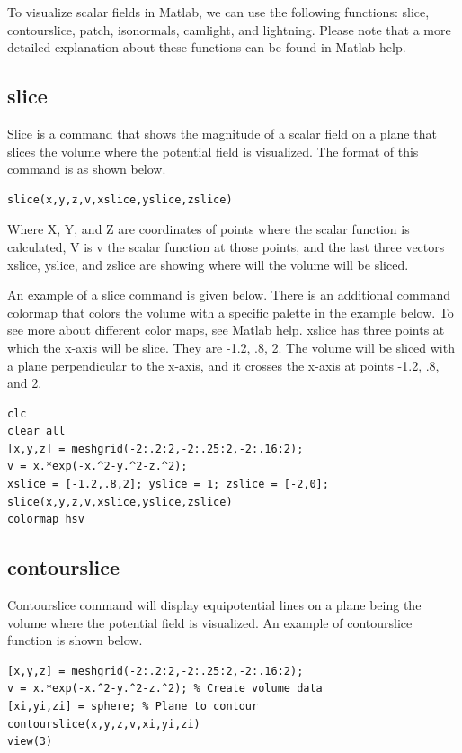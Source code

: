 \documentclass{ximera}
\begin{document}
To visualize scalar fields in Matlab, we can use the following functions: slice, contourslice, patch, isonormals, camlight, and lightning. Please note that a more detailed explanation about these functions can be found in Matlab help.

\subsection{slice}
 
Slice is a command that shows the magnitude of a scalar field on a plane that slices the volume where the potential field is visualized. The format of this command is as shown below.

\begin{verbatim}
slice(x,y,z,v,xslice,yslice,zslice)
\end{verbatim}

Where X, Y, and Z are coordinates of points where the scalar function is calculated, V is v the scalar function at those points, and the last three vectors xslice, yslice, and zslice are showing where will the volume will be sliced.

An example of a slice command is given below. There is an additional command colormap that colors the volume with a specific palette in the example below. To see more about different color maps, see Matlab help. xslice has three points at which the x-axis will be slice. They are -1.2, .8, 2. The volume will be sliced with a plane perpendicular to the x-axis, and it crosses the x-axis at points -1.2, .8, and 2. 
 
\begin{verbatim}
clc
clear all
[x,y,z] = meshgrid(-2:.2:2,-2:.25:2,-2:.16:2);
v = x.*exp(-x.^2-y.^2-z.^2);
xslice = [-1.2,.8,2]; yslice = 1; zslice = [-2,0];
slice(x,y,z,v,xslice,yslice,zslice)
colormap hsv
\end{verbatim}

\subsection{contourslice}

 Contourslice command will display equipotential lines on a plane being the volume where the potential field is visualized. An example of contourslice function is shown below.

\begin{verbatim}
[x,y,z] = meshgrid(-2:.2:2,-2:.25:2,-2:.16:2);
v = x.*exp(-x.^2-y.^2-z.^2); % Create volume data
[xi,yi,zi] = sphere; % Plane to contour
contourslice(x,y,z,v,xi,yi,zi)
view(3)
\end{verbatim}
\end{document}

